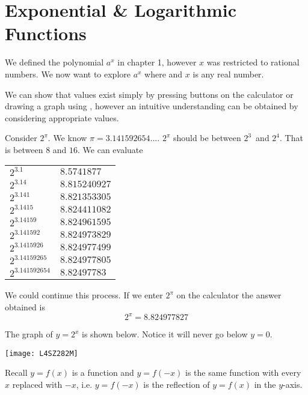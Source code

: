\chapter[Exponential Functions]{Exponential \& Logarithmic \\Functions}
We defined the polynomial $a^{x}$ in chapter 1, however $x$ was restricted to rational numbers. We now want to explore $a^{x}$ where and $x$ is any real number. 

We can show that values exist simply by pressing buttons on the calculator or drawing a graph using \desmos, however an intuitive understanding can be obtained by considering appropriate values. 

Consider $2^{\pi }$. We know $\pi  =3.141592654 \ldots $. $2^{\pi }$ should be between $2^{3}$\ and $2^{4}$. That is between $8$ and $16$. We can evaluate 

\qquad \qquad \qquad \qquad \qquad \qquad \qquad \qquad
\begin{tabular}[c]{ll}$2^{3.1}$  & $8.5741877$  \\
	$2^{3.14}$  & $8.815240927$  \\
	$2^{3.141}$  & $8.821353305$  \\
	$2^{3.1415}$  & $8.824411082$  \\
	$2^{3.14159}$  & $8.824961595$  \\
	$2^{3.141592}$  & $8.824973829$  \\
	$2^{3.1415926}$  & $8.824977499$  \\
	$2^{3.14159265}$  & $8.824977805$  \\
	$2^{3.141592654}$  & $8.82497783$
\end{tabular}

We could continue this process. If we enter $2^{\pi }$ on the calculator the answer obtained is
\begin{equation*}2^{\pi } =8.824977827
\end{equation*}

The graph of $y =2^{x}$ is shown below. Notice it will never go below $y=0$.\\ 
\begin{center}
	\texttt{[image: L4SZ282M]}
\end{center}

Recall $y =f (x)$ is a function and $y =f ( -x)$ is the same function with every $x$ replaced with $ -x$, i.e. $y =f ( -x)$ is the reflection of $y =f (x)$ in the $y$-axis. 

